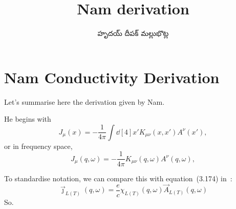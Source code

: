 \documentclass[../main.tex]{subfiles}
\title{Nam derivation}
\author{\begin{telugu}హృదయ్ దీపక్ మల్లుభొట్ల\end{telugu}}
\date{}
\begin{document}
	\onlyinsubfile{\maketitle}
	\section{Nam Conductivity Derivation} \label{sec:Nam}
	Let's summarise here the derivation given by Nam\supercite{Nam1967}.

	He begins with
	\begin{equation}
		J_\mu(x) = - \frac{1}{4\pi}\int \dd[4]{x'} K_{\mu\nu}(x, x') A^\nu(x'),
	\end{equation}
	or in frequency space,
	\begin{equation}
		J_\mu(q, \omega) = - \frac{1}{4\pi} K_{\mu\nu}(q, \omega) A^\nu(q, \omega),
	\end{equation}

	To standardise notation, we can compare this with equation~(3.174) in~\cite{Giuliani2005}:
	\begin{equation}
		\vec{\jmath}_{L(T)}(q, \omega) = \frac{e}{c} \chi_{L(T)}(q, \omega) \vec{A}_{L(T)}(q, \omega)
	\end{equation}
	So.
\end{document}
